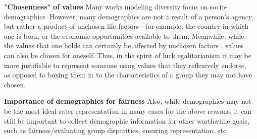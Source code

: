 \documentclass[11pt]{article}
\begin{document}
\textbf{"Chosenness" of values}
Many works modeling diversity focus on socio-demographics. However, many demographics are not a result of a person's agency, but rather a product of unchosen life factors - for example, the country in which one is born, or the economic opportunities available to them. Meanwhile, while the values that one holds can certainly be affected by unchosen factors \citep{Nguyen2024-NGUVCH}, values can also be chosen for oneself.
Thus, in the spirit of luck egalitarianism \citep{Dworkin2002-DWOSVT} it may be more justifiable to represent someone using values that they reflexively endorse, as opposed to boxing them in to the characteristics of a group they may not have chosen.

\textbf{Importance of demographics for fairness}
Also, while demographics may not be the most ideal rater representation in many cases for the above reasons, it can still be important to collect demographic information for other worthwhile goals, such as fairness/evaluating group disparities, ensuring representation, etc.

\newpage



\newpage




\newpage

\appendix

\setcounter{figure}{0}
\renewcommand{\thefigure}{A\arabic{figure}}






\end{document}
